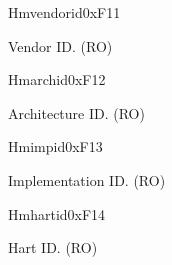 
\begin{register}{H}{mvendorid}{0xF11}\label{regdesc:MVENDORID}
%
\regnewline%
\begin{regdesc}\begin{reglist}
\label{fielddesc:MVENDORID}\item [MVENDORID] Vendor ID. (RO)
\end{reglist}\end{regdesc}
\end{register}

\begin{register}{H}{marchid}{0xF12}\label{regdesc:MARCHID}
%
\regnewline%
\begin{regdesc}\begin{reglist}
\label{fielddesc:MARCHID}\item [MARCHID] Architecture ID. (RO)
\end{reglist}\end{regdesc}
\end{register}

\begin{register}{H}{mimpid}{0xF13}\label{regdesc:MIMPID}
%
\regnewline%
\begin{regdesc}\begin{reglist}
\label{fielddesc:MIMPID}\item [MIMPID] Implementation ID. (RO)
\end{reglist}\end{regdesc}
\end{register}

\begin{register}{H}{mhartid}{0xF14}\label{regdesc:MHARTID}
%
\regnewline%
\begin{regdesc}\begin{reglist}
\label{fielddesc:MHARTID}\item [MHARTID] Hart ID. (RO)
\end{reglist}\end{regdesc}
\end{register}

